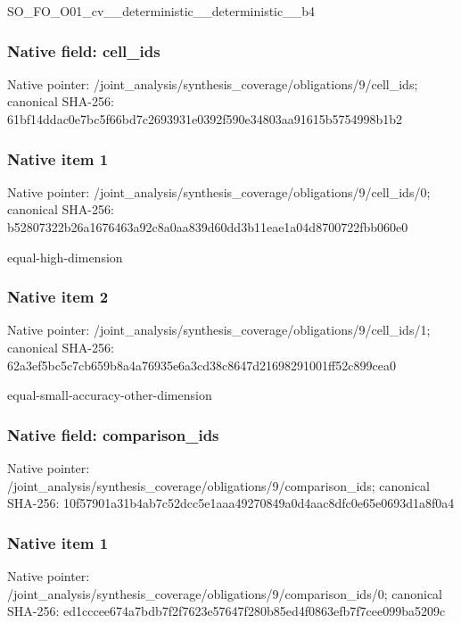 \documentclass[10pt,a4paper]{article}
\begin{document}
\begingroup\raggedright\sloppy SO\_\allowbreak{}FO\_\allowbreak{}O01\_\allowbreak{}cv\_\allowbreak{}\_\allowbreak{}deterministic\_\allowbreak{}\_\allowbreak{}deterministic\_\allowbreak{}\_\allowbreak{}b4\par\endgroup

\subsubsection{Native field: cell\_\allowbreak{}ids}
Native pointer: /joint\_\allowbreak{}analysis/synthesis\_\allowbreak{}coverage/obligations/9/cell\_\allowbreak{}ids; canonical SHA-256: 61bf14ddac0e7bc5f66bd7c2693931e0392f590e34803aa91615b5754998b1b2

\subsubsection{Native item 1}
Native pointer: /joint\_\allowbreak{}analysis/synthesis\_\allowbreak{}coverage/obligations/9/cell\_\allowbreak{}ids/0; canonical SHA-256: b52807322b26a1676463a92c8a0aa839d60dd3b11eae1a04d8700722fbb060e0

\begingroup\raggedright\sloppy equal-high-dimension\par\endgroup

\subsubsection{Native item 2}
Native pointer: /joint\_\allowbreak{}analysis/synthesis\_\allowbreak{}coverage/obligations/9/cell\_\allowbreak{}ids/1; canonical SHA-256: 62a3ef5bc5c7cb659b8a4a76935e6a3cd38c8647d21698291001ff52c899cea0

\begingroup\raggedright\sloppy equal-small-accuracy-other-dimension\par\endgroup

\subsubsection{Native field: comparison\_\allowbreak{}ids}
Native pointer: /joint\_\allowbreak{}analysis/synthesis\_\allowbreak{}coverage/obligations/9/comparison\_\allowbreak{}ids; canonical SHA-256: 10f57901a31b4ab7c52dcc5e1aaa49270849a0d4aac8dfc0e65e0693d1a8f0a4

\subsubsection{Native item 1}
Native pointer: /joint\_\allowbreak{}analysis/synthesis\_\allowbreak{}coverage/obligations/9/comparison\_\allowbreak{}ids/0; canonical SHA-256: ed1cccee674a7bdb7f2f7623e57647f280b85ed4f0863efb7f7cee099ba5209c
\end{document}
